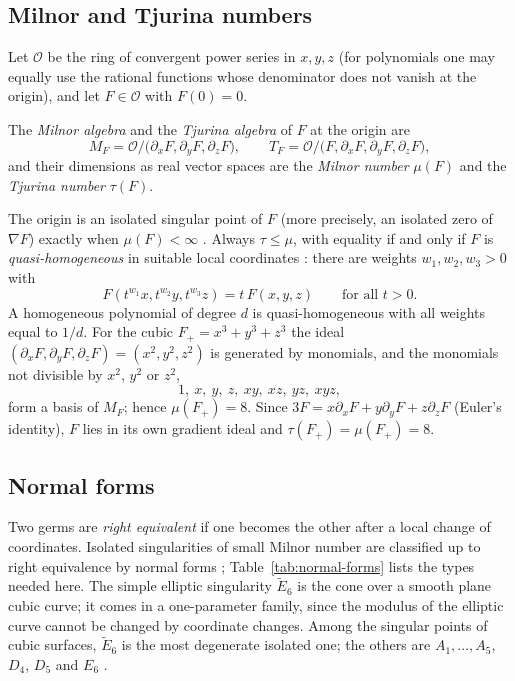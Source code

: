 \subsection{Milnor and Tjurina numbers}

Let $\mathcal{O}$ be the ring of convergent power series in $x,y,z$ (for
polynomials one may equally use the rational functions whose denominator does
not vanish at the origin), and let $F\in\mathcal{O}$ with $F(0)=0$.

\begin{definition}
\label{def:milnor}
The \emph{Milnor algebra} and the \emph{Tjurina algebra} of $F$ at the origin are
\[
M_F=\mathcal{O}\big/\big(\partial_xF,\partial_yF,\partial_zF\big),\qquad
T_F=\mathcal{O}\big/\big(F,\partial_xF,\partial_yF,\partial_zF\big),
\]
and their dimensions as real vector spaces are the \emph{Milnor number}
$\mu(F)$ and the \emph{Tjurina number} $\tau(F)$.
\end{definition}

The origin is an isolated singular point of $F$ (more precisely, an isolated
zero of $\nabla F$) exactly when $\mu(F)<\infty$ \cite{greuel2007introduction}.
Always $\tau\le\mu$, with equality if and only if $F$ is
\emph{quasi-homogeneous} in suitable local coordinates
\cite{saito1971quasihomogene}: there are weights $w_1,w_2,w_3>0$ with
\begin{equation}
\label{eq:quasihomogeneous}
F(t^{w_1}x,t^{w_2}y,t^{w_3}z)=t\,F(x,y,z)\qquad\text{for all }t>0.
\end{equation}
A homogeneous polynomial of degree $d$ is quasi-homogeneous with all weights
equal to $1/d$. For the cubic $F_+=x^3+y^3+z^3$ the ideal
$(\partial_xF,\partial_yF,\partial_zF)=(x^2,y^2,z^2)$ is generated by monomials,
and the monomials not divisible by $x^2$, $y^2$ or $z^2$,
\begin{equation}
\label{eq:milnor-basis}
1,\ x,\ y,\ z,\ xy,\ xz,\ yz,\ xyz,
\end{equation}
form a basis of $M_F$; hence $\mu(F_+)=8$. Since $3F=x\partial_xF+y\partial_yF+z\partial_zF$
(Euler's identity), $F$ lies in its own gradient ideal and $\tau(F_+)=\mu(F_+)=8$.

\subsection{Normal forms}

Two germs are \emph{right equivalent} if one becomes the other after a local
change of coordinates. Isolated singularities of small Milnor number are
classified up to right equivalence by normal forms
\cite{arnold2012singularities}; Table~\ref{tab:normal-forms} lists the types
needed here. The simple elliptic singularity $\tilde E_6$ is the cone over a
smooth plane cubic curve; it comes in a one-parameter family, since the
modulus of the elliptic curve cannot be changed by coordinate changes.
Among the singular points of cubic surfaces, $\tilde E_6$ is the most
degenerate isolated one; the others are $A_1,\dots,A_5$, $D_4$, $D_5$ and
$E_6$ \cite{bruce1979classification}.

